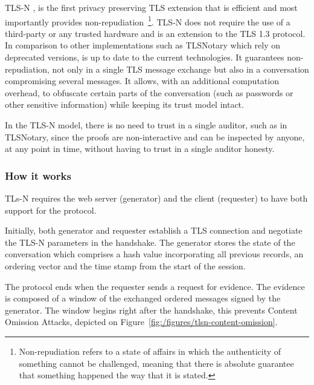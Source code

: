 TLS-N \cite{Ritzdorf2017}, is the first privacy preserving TLS extension that is efficient and most importantly provides non-repudiation~\footnote{Non-repudiation refers to a state of affairs in which the authenticity of something cannot be challenged, meaning that there is absolute guarantee that something happened the way that it is stated.}. TLS-N does not require the use of a third-party or any trusted hardware and is an extension to the TLS 1.3 protocol. In comparison to other implementations such as TLSNotary which rely on deprecated versions, is up to date to the current technologies.
It guarantees non-repudiation, not only in a single TLS message exchange but also in a conversation compromising several messages. It allows, with an additional computation overhead, to obfuscate certain parts of the conversation (such as passwords or other sensitive information) while keeping its trust model intact.

In the TLS-N model, there is no need to trust in a single auditor, such as in TLSNotary, since the proofs are non-interactive and can be inspected by anyone, at any point in time, without having to trust in a single auditor honesty.


\subsubsection{How it works}
TLs-N requires the web server (generator) and the client (requester) to have both support for the protocol.

Initially, both generator and requester establish a TLS connection and negotiate the TLS-N parameters in the handshake. The generator stores the state of the conversation which comprises a hash value incorporating all previous records, an ordering vector and the time stamp from the start of the session.

The protocol ends when the requester sends a request for evidence. The evidence is composed of a window of the exchanged ordered messages signed by the generator. The window begins right after the handshake, this prevents Content Omission Attacks, depicted on Figure~\ref{fig:/figures/tlsn-content-omission}.


